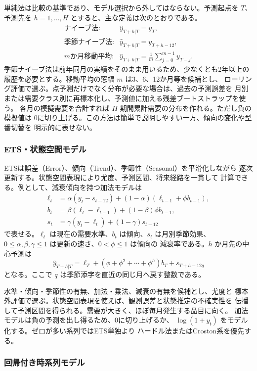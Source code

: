 \documentclass[a4paper,11pt]{jsarticle}
\begin{document}
単純法は比較の基準であり、モデル選択から外してはならない。予測起点を
$T$、予測先を $h=1,\ldots,H$ とすると、主な定義は次のとおりである。
\[
\begin{array}{ll}
\text{ナイーブ法:} & \hat y_{T+h|T}=y_T,\\[2mm]
\text{季節ナイーブ法:} & \hat y_{T+h|T}=y_{T+h-12},\\[2mm]
\text{$m$か月移動平均:} &
\displaystyle \hat y_{T+h|T}=\frac{1}{m}\sum_{j=0}^{m-1}y_{T-j}.
\end{array}
\]
季節ナイーブ法は前年同月の実績をそのまま用いるため、少なくとも2年以上の
履歴を必要とする。移動平均の窓幅 $m$ は3、6、12か月等を候補とし、
ローリング評価で選ぶ。点予測だけでなく分布が必要な場合は、過去の予測誤差を
月別または需要クラス別に再標本化し、予測値に加える残差ブートストラップを使う。
各月の模擬需要を合計すれば $H$ 期間累計需要の分布を作れる。ただし負の模擬値は
0に切り上げる。この方法は簡単で説明しやすい一方、傾向の変化や型番切替を
明示的に表せない。

\subsubsection{ETS・状態空間モデル}

ETSは誤差（Error）、傾向（Trend）、季節性（Seasonal）を平滑化しながら
逐次更新する。状態空間表現により尤度、予測区間、将来経路を一貫して
計算できる\cite{hyndman2002ets}。例として、減衰傾向を持つ加法モデルは
\begin{align}
\ell_t&=\alpha(y_t-s_{t-12})+(1-\alpha)(\ell_{t-1}+\phi b_{t-1}),\\
b_t&=\beta(\ell_t-\ell_{t-1})+(1-\beta)\phi b_{t-1},\\
s_t&=\gamma(y_t-\ell_t)+(1-\gamma)s_{t-12}
\end{align}
で表せる。$\ell_t$ は現在の需要水準、$b_t$ は傾向、$s_t$ は月別季節効果、
$0\leq\alpha,\beta,\gamma\leq1$ は更新の速さ、$0<\phi\leq1$ は傾向の
減衰率である。$h$ か月先の中心予測は
\[
\hat y_{T+h|T}=\ell_T+(\phi+\phi^2+\cdots+\phi^h)b_T+s_{T+h-12q}
\]
となる。ここで $q$ は季節添字を直近の同じ月へ戻す整数である。

水準・傾向・季節性の有無、加法・乗法、減衰の有無を候補とし、尤度と
標本外評価で選ぶ。状態空間表現を使えば、観測誤差と状態推定の不確実性を
伝播して予測区間を得られる。需要が大きく、ほぼ毎月発生する品目に向く。
加法モデルは負の予測を出し得るため、0に切り上げるか、
$\log(1+y_t)$ をモデル化する。ゼロが多い系列ではETS単独より
ハードル法またはCroston系を優先する。

\subsubsection{回帰付き時系列モデル}
\end{document}
